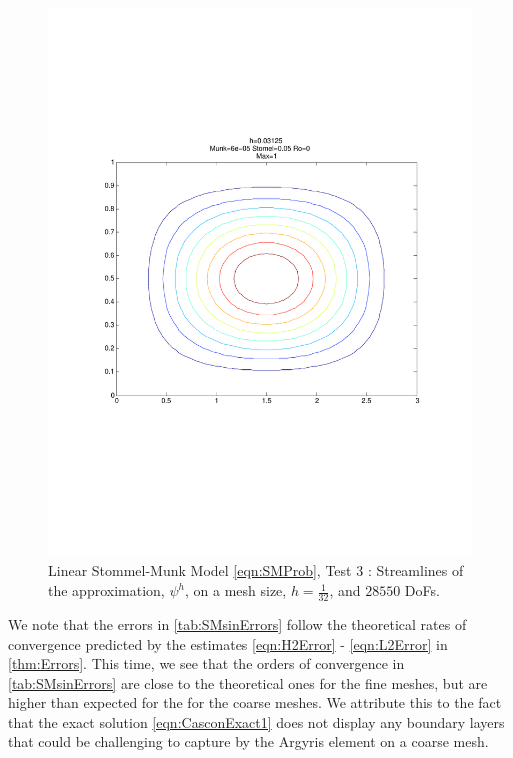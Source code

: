 \begin{figure}[H]
  \begin{center}
    \includegraphics[trim=0 200 20 220, clip=true, scale=0.5]{StommelMunk1.pdf}
    \caption{Linear Stommel-Munk Model \eqref{eqn:SMProb}, Test 3 \cite{Cascon}: Streamlines of the approximation,
    $\psi^h$, on a mesh size, $h=\frac{1}{32}$, and $28550$ DoFs.}
    \label{fig:StommelMunkSin}
  \end{center}
\end{figure}

We note that the errors in \autoref{tab:SMsinErrors} follow the theoretical rates of convergence
predicted by the estimates \eqref{eqn:H2Error} - \eqref{eqn:L2Error} in \autoref{thm:Errors}.  This
time, we see that the orders of convergence in \autoref{tab:SMsinErrors} are close to the
theoretical ones for the fine meshes, but are higher than expected for the for the coarse meshes. We
attribute this to the fact that the exact solution \eqref{eqn:CasconExact1} does not display any
boundary layers that could be challenging to capture by the Argyris element on a coarse mesh. 

